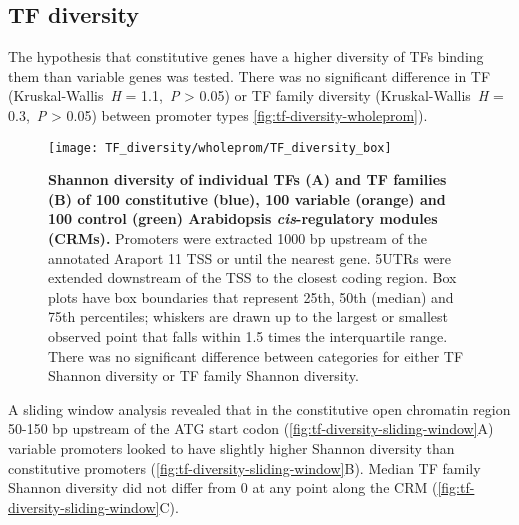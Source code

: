 \documentclass[../main.tex]{subfiles}
\begin{document}
\subsection{TF diversity}
The hypothesis that constitutive genes have a higher diversity of TFs binding them than variable genes was tested.
There was no significant difference in TF (Kruskal\hyp{}Wallis~\textit{H} = 1.1,~\textit{P} \textgreater{} 0.05) or TF family diversity (Kruskal\hyp{}Wallis~\textit{H} = 0.3,~\textit{P} \textgreater{} 0.05) between promoter types \autoref{fig:tf-diversity-wholeprom}).

\begin{figure}[hbt!]
	\begin{center}
		\capstart
		\texttt{[image: TF\_diversity/wholeprom/TF\_diversity\_box]}
		\caption{
			\textbf{Shannon diversity of individual TFs (A) and TF families (B) of 100 constitutive (blue), 100 variable (orange) and 100 control (green) Arabidopsis \textit{cis}\hyp{}regulatory modules (CRMs).}
			Promoters were extracted 1000 bp upstream of the annotated Araport 11 \autocite{chengAraport11CompleteReannotation2017} TSS or until the nearest gene.
			5UTRs were extended downstream of the TSS to the closest coding region.  Box plots have box boundaries that represent 25th, 50th (median) and 75th percentiles; whiskers are drawn up to the largest or smallest observed point that falls within 1.5 times the interquartile range.
			There was no significant difference between categories for either TF Shannon diversity or TF family Shannon diversity.
			\label{fig:tf-diversity-wholeprom}
		}
	\end{center}
\end{figure}

A sliding window analysis revealed that in the constitutive open chromatin region 50-150 bp upstream of the ATG start codon (\autoref{fig:tf-diversity-sliding-window}A) variable promoters looked to have slightly higher Shannon diversity than constitutive promoters (\autoref{fig:tf-diversity-sliding-window}B). Median TF family Shannon diversity did not differ from 0 at any point along the CRM (\autoref{fig:tf-diversity-sliding-window}C).
\end{document}
